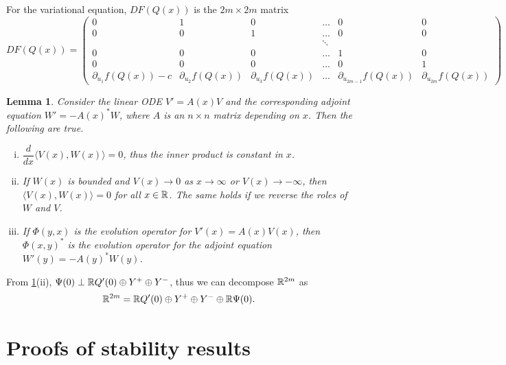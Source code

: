 \documentclass[11pt,reqno]{amsart}
\theoremstyle{plain}
\newtheorem{lemma}[theorem]{Lemma}
\theoremstyle{definition}
\theoremstyle{remark}
\begin{document}
For the variational equation, $DF(Q(x))$ is the $2m \times 2m$ matrix
\begin{equation}\label{defDF}
DF(Q(x)) = 
\begin{pmatrix}
0 & 1 & 0 & \dots & 0 & 0 \\
0 & 0 & 1 & \dots & 0 & 0 \\
& && \ddots \\
0 & 0 & 0 & \dots & 1 & 0 \\
0 & 0 & 0 & \dots & 0 & 1 \\
\partial_{u_1}f(Q(x)) - c & \partial_{u_2}f(Q(x)) & \partial_{u_3}f(Q(x)) & \dots & \partial_{u_{2m-1}}f(Q(x)) & \partial_{u_{2m}}f(Q(x))
\end{pmatrix}
\end{equation}

\begin{lemma}\label{eigadjoint}
Consider the linear ODE $V' = A(x)V$ and the corresponding adjoint equation $W' = -A(x)^* W$, where $A$ is an $n \times n$ matrix depending on $x$. Then the following are true.
\begin{enumerate}[(i)]
\item $\dfrac{d}{dx}\langle V(x), W(x) \rangle = 0$, thus the inner product is constant in $x$.
\item If $W(x)$ is bounded and $V(x) \rightarrow 0$ as $x \rightarrow \infty$ or $V(x) \rightarrow -\infty$, then $\langle V(x), W(x) \rangle = 0$ for all $x \in \mathbb{R}$. The same holds if we reverse the roles of $W$ and $V$.
\item If $\Phi(y, x)$ is the evolution operator for $V'(x) = A(x)V(x)$, then $\Phi(x, y)^*$ is the evolution operator for the adjoint equation $W'(y) = -A(y)^* W(y)$.
\end{enumerate}
\end{lemma}

\noi From \cref{eigadjoint}(ii), $\Psi(0) \perp \mathbb{R} Q'(0) \oplus Y^+ \oplus Y^-$, thus we can decompose $\mathbb{R}^{2m}$ as
\begin{equation}\label{R2mdecomp}
\mathbb{R}^{2m} = \mathbb{R} Q'(0) \oplus Y^+ \oplus Y^- \oplus \mathbb{R} \Psi(0).
\end{equation}

\section{Proofs of stability results}
\end{document}
